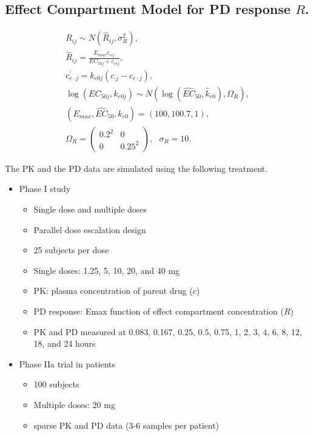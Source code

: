 \documentclass[10pt, reqno, oneside]{amsbook}
\numberwithin{equation}{chapter}
\numberwithin{figure}{chapter}
\numberwithin{table}{chapter}
\theoremstyle{remark}
\begin{document}
\subsection{Effect Compartment Model for PD response \(R\).}
\label{sec:org4d07728}
\begin{gather*}
R_{ij} \sim N\left(\widehat{R}_{ij},\sigma_{R}^2\right), \\
\widehat{R}_{ij} = \frac{E_{max}c_{eij}}{EC_{50j} + c_{eij}}, \\
c_{e\cdot j}^\prime = k_{e0j}\left(c_{\cdot j} - c_{e\cdot j}\right), \\
\log\left(EC_{50j}, k_{e0j}\right) \sim N\left(\log\left(\widehat{EC}_{50}, \widehat{k}_{e0}\right),\Omega_R\right), \\
\left(E_{max}, \widehat{EC}_{50},\widehat{k}_{e0}\right) = \left(100, 100.7, 1\right), \\
\Omega_R = \left(\begin{array}{cc} 0.2^2 & 0 \\ 0 & 0.25^2  \end{array}\right), \ \ \ \sigma_R = 10.
\end{gather*}

The PK and the PD data are simulated using the following
treatment.
\begin{itemize}
\item Phase I study
\begin{itemize}
\item Single dose and multiple doses
\item Parallel dose escalation design
\item 25 subjects per dose
\item Single doses: 1.25, 5, 10, 20, and 40 mg
\item PK: plasma concentration of parent drug (\(c\))
\item PD response: Emax function of effect compartment concentration (\(R\))
\item PK and PD measured at 0.083, 0.167, 0.25, 0.5, 0.75, 1, 2, 3, 4, 6, 8, 12, 18, and 24 hours
\end{itemize}
\item Phase IIa trial in patients
\begin{itemize}
\item 100 subjects
\item Multiple doses: 20 mg
\item sparse PK and PD data (3-6 samples per patient)
\end{itemize}
\end{itemize}
\end{document}
